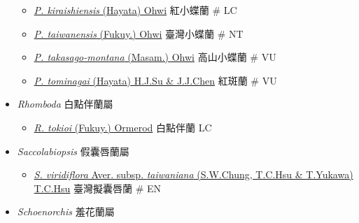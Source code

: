 \begin{itemize}
  \begin{itemize}
        \item[] \href{http://www.theplantlist.org/tpl1.1/search?q=Ponerorchis+kiraishiensis}{\textit{P. kiraishiensis} (Hayata) Ohwi}   紅小蝶蘭  \# LC
        \item[] \href{http://www.theplantlist.org/tpl1.1/search?q=Ponerorchis+taiwanensis}{\textit{P. taiwanensis} (Fukuy.) Ohwi}   臺灣小蝶蘭  \# NT
        \item[] \href{http://www.theplantlist.org/tpl1.1/search?q=Ponerorchis+takasago-montana}{\textit{P. takasago-montana} (Masam.) Ohwi}   高山小蝶蘭  \# VU
        \item[] \href{http://www.theplantlist.org/tpl1.1/search?q=Ponerorchis+tominagai}{\textit{P. tominagai} (Hayata) H.J.Su \& J.J.Chen}   紅斑蘭  \# VU
  \end{itemize}
 \item[] \textit{Rhomboda} 白點伴蘭屬
                                
  \begin{itemize}
        \item[] \href{http://www.theplantlist.org/tpl1.1/search?q=Rhomboda+tokioi}{\textit{R. tokioi} (Fukuy.) Ormerod}   白點伴蘭   LC
  \end{itemize}
 \item[] \textit{Saccolabiopsis} 假囊唇蘭屬
                                
  \begin{itemize}
        \item[] \href{http://www.theplantlist.org/tpl1.1/search?q=Saccolabiopsis+viridiflora+subsp.+taiwaniana}{\textit{S. viridiflora} Aver. subsp. \textit{taiwaniana} (S.W.Chung, T.C.Hsu \& T.Yukawa) T.C.Hsu}   臺灣擬囊唇蘭  \# EN
  \end{itemize}
 \item[] \textit{Schoenorchis} 羞花蘭屬
                                

\end{itemize}
